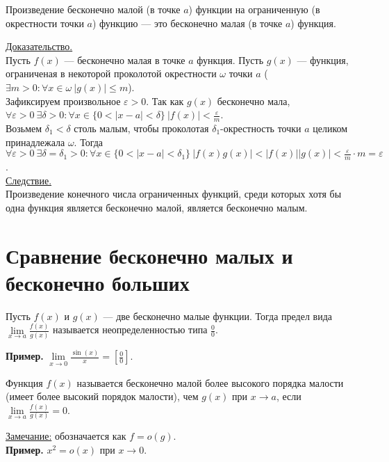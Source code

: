 \documentclass{article}
\begin{document}
\begin{theorem}
    Произведение бесконечно малой (в точке \(a\)) функции на ограниченную (в окрестности точки \(a\)) функцию --- это бесконечно малая (в точке \(a\)) функция.
\end{theorem}
\noindent
\underline{Доказательство.}\\
Пусть \(f(x)\) --- бесконечно малая в точке \(a\) функция. Пусть \(g(x)\) --- функция, ограниченая в некоторой проколотой окрестности \(\omega\) точки \(a\) (\(\displaystyle \exists m > 0 : \forall x \in \omega\ \vert g(x) \vert \leq m\)).\\
Зафиксируем произвольное \(\displaystyle \varepsilon > 0\). Так как \(g(x)\) бесконечно мала, \(\displaystyle \forall \varepsilon > 0\ \exists \delta > 0: \forall x \in \{0 < \vert x - a \vert < \delta\}\ \vert f(x) \vert < \frac{\varepsilon}{m}\).\\
Возьмем \(\delta_{1} < \delta \) столь малым, чтобы проколотая \(\delta_{1}\)-окрестность точки \(a\) целиком принадлежала \(\omega \).
Тогда \(\displaystyle \forall \varepsilon > 0\ \exists \delta = \delta_{1} > 0: \forall x \in \{0 < \vert x - a \vert < \delta_{1}\}\ \vert f(x)g(x) \vert < \vert f(x) \vert \vert g(x) \vert < \frac{\varepsilon}{m} \cdot m = \varepsilon\).\\        
\underline{Следствие.}\\
Произведение конечного числа ограниченных функций, среди которых хотя бы одна функция является бесконечно малой, является бесконечно малым.

\section{Сравнение бесконечно малых и бесконечно больших}
\begin{definition}
    Пусть \(f(x)\) и \(g(x)\) --- две бесконечно малые функции. Тогда предел вида \(\displaystyle \lim\limits_{x \to a} \frac{f(x)}{g(x)}\) называется неопределенностью типа \(\displaystyle \frac{0}{0}\).    
\end{definition}
\noindent
\textbf{Пример.} \(\displaystyle \lim\limits_{x \to 0} \frac{\sin(x)}{x} = \left[\frac{0}{0}\right]\).

\begin{definition}
    Функция \(f(x)\) называется бесконечно малой более высокого порядка малости (имеет более высокий порядок малости), чем \(g(x)\) при \(x \to a\), если \(\displaystyle \lim\limits_{x \to a}\frac{f(x)}{g(x)} = 0\).   
\end{definition}
\noindent
\underline{Замечание:} обозначается как \(f = o(g)\).\\
\textbf{Пример.} \(x^2 = o(x)\) при \(x \to 0\).
\end{document}
